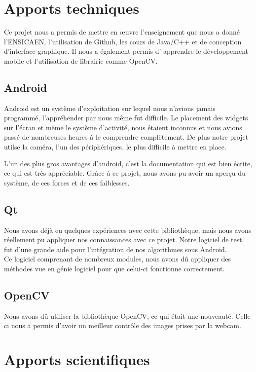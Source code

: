 \section{Apports techniques}

Ce projet nous a permis de mettre en œuvre l'enseignement que nous a donné l'ENSICAEN, l'utilisation de Github, les cours de Java/C++ et de conception d'interface graphique. Il nous a également permis d'
apprendre le développement mobile et l'utilisation de librairie comme OpenCV\@.

\subsection{Android}
	Android est un système d'exploitation sur lequel nous n'avions jamais programmé, l'appréhender par nous même fut difficile.
	Le placement des widgets sur l'écran et même le système d'activité, nous étaient inconnus et nous avions passé de nombreuses heures à le comprendre complètement.
	De plus notre projet utilse la caméra, l'un des périphériques, le plus difficile à mettre en place.

	L'un des plus gros avantages d'android, c'est la documentation qui est bien écrite, ce qui est très appréciable. Grâce à ce projet, nous avons pu avoir un aperçu du système, de ces forces et
	de ces faiblesses.

\subsection{Qt}
	Nous avons déjà eu quelques expériences avec cette bibliothèque, mais nous avons réellement pu appliquer nos connaissances avec ce projet.
	Notre logiciel de test fut d'une grande aide pour l'intégration de nos algorithmes sous Android.\\
	Ce logiciel comprenant de nombreux modules, nous avons dû appliquer des méthodes vue en génie logiciel pour que celui-ci fonctionne correctement.

\subsection{OpenCV}
Nous avons dû utiliser la bibliothèque OpenCV, ce qui était une nouveauté. Celle ci nous a permis d'avoir un meilleur contrôle des images prises par la webcam.

\section{Apports scientifiques}


